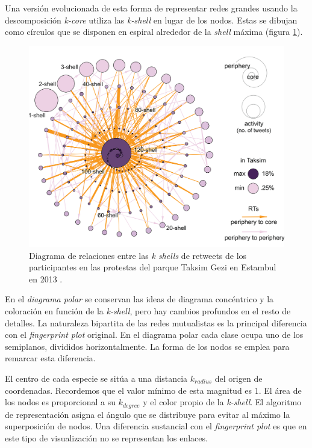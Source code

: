 Una versión evolucionada de esta forma de representar redes grandes usando la descomposición \textit{k-core} utiliza las \textit{k-shell} en lugar de los nodos. Estas se dibujan como círculos que se disponen en espiral alrededor de la \textit{shell} máxima (figura \ref{fig:VIS_taksim}).

\begin{figure}[h!]
\centering
\includegraphics[scale=0.6]{Figures/VIS_taksim.png}
\caption{Diagrama de relaciones entre las \textit{k shells} de retweets de los participantes en las protestas del parque Taksim Gezi en Estambul en 2013   \cite{barbera2015critical}.}
\label{fig:VIS_taksim}
\end{figure}


En el \textit{diagrama polar} se conservan las ideas de diagrama concéntrico y la coloración en función de la \textit{k-shell}, pero hay cambios profundos en el resto de detalles. La naturaleza bipartita de las redes mutualistas es la principal diferencia con el \textit{fingerprint plot} original. En el diagrama polar cada clase ocupa uno de los semiplanos, divididos horizontalmente. La forma de los nodos se emplea para remarcar esta diferencia. 

El centro de cada especie se sitúa a una distancia $k_{radius}$ del origen de coordenadas. Recordemos que el valor mínimo de esta magnitud es $1$. El área de los nodos es proporcional a su $k_{degree}$ y el color propio de la \textit{k-shell}. El algoritmo de representación asigna el ángulo que se distribuye para evitar al máximo la superposición de nodos. Una diferencia sustancial con el  \textit{fingerprint plot} es que en este tipo de visualización no se representan los enlaces.

